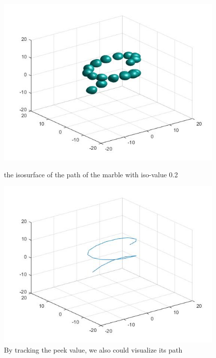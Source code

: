 \documentclass[12pt]{article}
\begin{document}
\begin{figure}[H]
  \includegraphics[width=\linewidth]{trajectory.jpg}
  \caption{the isosurface of the path of the marble with iso-value 0.2}\label{fig:awesome_image1}
\endminipage\hfill
{}%
  \includegraphics[width=\linewidth]{path.jpg}
  \caption{By tracking the peek value, we also could visualize its path}\label{fig:awesome_image3}
\endminipage
\end{figure}
\end{document}
